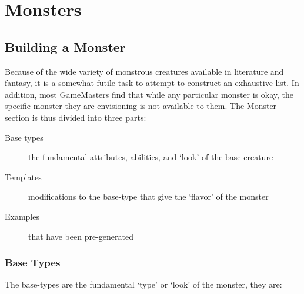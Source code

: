 \documentclass[twoside]{book}
\begin{document}
    

\chapter{Monsters}
    
    

\section{Building a Monster}
    
    {  
    Because of the wide variety of monstrous creatures
             available in literature and fantasy, it is a somewhat futile
             task to attempt to construct an exhaustive list. In
             addition, most GameMasters find that while any particular
             monster is okay, the specific monster they are envisioning
             is not available to them. The Monster section is thus
             divided into three parts: 
    }
  
\begin{description}
    
  \item[Base types] 
    {  
    the fundamental
               attributes, abilities, and `look' of the base
               creature
    }
  
  \item[Templates] 
    {  
    modifications to the
               base-type that give the `flavor' of the
               monster
    }
  
  \item[Examples] 
    {  
     that have been
               pre-generated
    }
  
\end{description}
  
    

\subsection{Base Types}
    
    {  
    The base-types are the fundamental
               `type' or `look' of the monster,
               they are: 
    }
  
\end{document}
